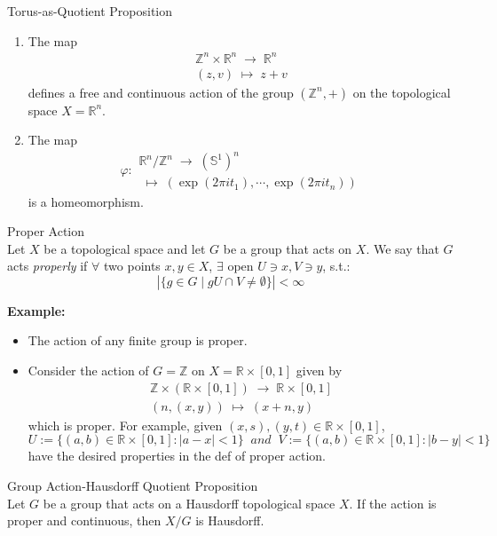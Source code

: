 \begin{proposition}{Torus-as-Quotient Proposition}\\
\begin{enumerate}
    \item The map
    $$\substack{\mathbb{Z}^n \times \mathbb{R}^n \;\to\; \mathbb{R}^n\\
    (z,v) \;\mapsto\; z+v}$$
    defines a free and continuous action of the group $(\mathbb{Z}^n ,+)$ on the topological space $X= \mathbb{R}^n$.

    \item The map
    $$\varphi: \substack{\mathbb{R}^n/\mathbb{Z}^n \;\to\; (\mathbb{S}^1)^n\\
    [(t_1,\cdots,t_n)] \;\mapsto \; (\exp (2\pi it_1), \cdots, \exp (2\pi it_n))}$$
    is a homeomorphism.
\end{enumerate}
\end{proposition}

\begin{definition}{Proper Action}\\
Let $X$ be a topological space and let $G$ be a group that acts on $X$. We say that $G$ acts \textit{properly} if $\forall$ two points $x,y \in X$, $\exists$ open $U \ni x,V\ni y$, s.t.:
$$|\{g \in G \mid gU \cap V\neq \emptyset\} | < \infty$$
\end{definition}

\noindent\textbf{Example:} \begin{itemize}
    \item The action of any finite group is proper.
    \item Consider the action of $G=\mathbb{Z}$ on $X= \mathbb{R} \times [0,1]$ given by
    $$\substack{\mathbb{Z} \times (\mathbb{R} \times [0,1]) \;\to\; \mathbb{R} \times [0,1] \\
    (n,(x,y)) \;\mapsto\; (x+n,y)}$$
    which is proper. For example, given $(x,s), (y,t) \in \mathbb{R}\times [0,1]$,
    $$U:= \{(a,b) \in \mathbb{R} \times [0,1] : |a-x| <1\} \;\;and\;\; V:= \{(a,b) \in \mathbb{R} \times [0,1] : |b-y| <1\}$$
    have the desired properties in the def of proper action.
\end{itemize}

\begin{proposition}{Group Action-Hausdorff Quotient Proposition}\\
Let $G$ be a group that acts on a Hausdorff topological space $X$. If the action is proper and continuous, then $X/G$ is Hausdorff.
\end{proposition}

